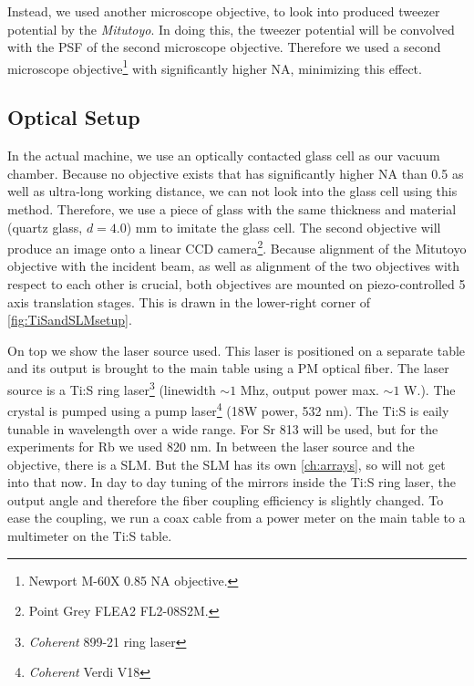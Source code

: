Instead, we used another microscope objective, to look into produced tweezer potential by the \textit{Mitutoyo}. 
In doing this, the tweezer potential will be convolved with the \ac{PSF} of the second microscope objective\cite{Baumgaertner2017}.
Therefore we used a second microscope objective\footnote{Newport M-60X 0.85 NA objective.} with significantly higher \ac{NA}, minimizing this effect. 

\subsection{Optical Setup}

In the actual machine, we use an optically contacted glass cell as our vacuum chamber. Because no objective exists that has significantly higher NA than 0.5 as well as ultra-long working distance, we can not look into the glass cell using this method. Therefore, we use a piece of glass with the same thickness and material (quartz glass, $d = 4.0$) mm to imitate the glass cell. The second objective will produce an image onto a linear CCD camera\footnote{Point Grey FLEA2 FL2-08S2M.}. Because alignment of the Mitutoyo objective with the incident beam, as well as alignment of the two objectives with respect to each other is crucial, both objectives are mounted on piezo-controlled 5 axis translation stages. 
This is drawn in the lower-right corner of \cref{fig:TiSandSLMsetup}.

On top we show the laser source used.
This laser is positioned on a separate table and its output is brought to the main table using a \ac{PM} optical fiber. 
The laser source is a \ac{Ti:S} ring laser\footnote{\textit{Coherent} 899-21 ring laser} (linewidth $\sim 1$ Mhz, output power max. $\sim 1$ W.). 
The crystal is pumped using a pump laser\footnote{\textit{Coherent} Verdi V18} (18W power, 532 nm). 
The \ac{Ti:S} is eaily tunable in wavelength over a wide range. For Sr 813 will be used, but for the experiments for Rb we used 820 nm. 
In between the laser source and the objective, there is a \ac{SLM}. But the SLM has its own \cref{ch:arrays}, so will not get into that now. 
In day to day tuning of the mirrors inside the Ti:S ring laser, the output angle and therefore the fiber coupling efficiency is slightly changed. 
To ease the coupling, we run a coax cable from a power meter on the main table to a multimeter on the Ti:S table. 

